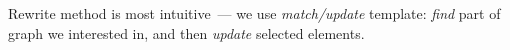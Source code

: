 
Rewrite method is most intuitive\ ---  we use \emph{match/update} template:
\emph{find} part of graph we interested in, and then \emph{update} selected
elements.
